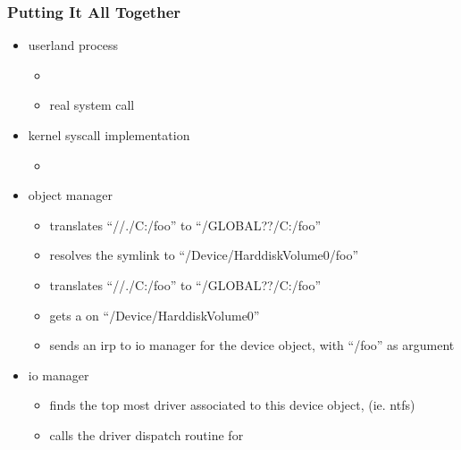 \begin{frame}
  \frametitle{Putting It All Together}

  \begin{itemize}
    \item
      userland process
      \begin{itemize}
        \item
        \item
          real system call 
      \end{itemize}

    \item
      kernel syscall implementation
      \begin{itemize}
        \item
      \end{itemize}

    \item
      object manager
      \begin{itemize}
        \item
          translates ``//./C:/foo'' to ``/GLOBAL??/C:/foo''
        \item
          resolves the symlink to ``/Device/HarddiskVolume0/foo''
        \item
          translates ``//./C:/foo'' to ``/GLOBAL??/C:/foo''
        \item
          gets a  on ``/Device/HarddiskVolume0''
        \item
          sends an  irp to io manager for the device object,  with ``/foo'' as argument
      \end{itemize}

    \item
      io manager
      \begin{itemize}
        \item
          finds the top most driver associated to this device object, (ie. ntfs)
        \item
          calls the driver dispatch routine for 
      \end{itemize}

  \end{itemize}

\end{frame}

%
%

